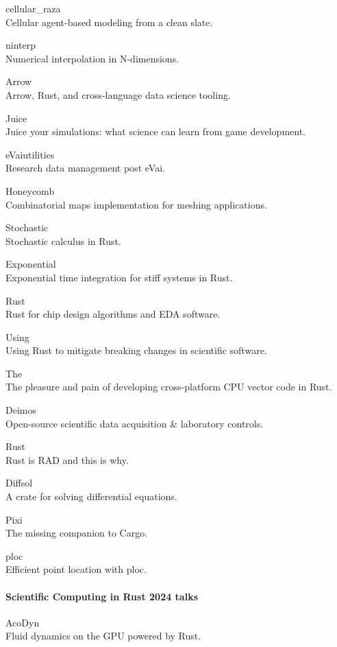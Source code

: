 \documentclass{article}
\begin{document}
cellular\_raza\\
Cellular agent-based modeling from a clean slate.

ninterp\\
Numerical interpolation in N-dimensions.

Arrow\\
Arrow, Rust, and cross-language data science tooling.

Juice\\
Juice your simulations: what science can learn from game development.

eVaiutilities\\
Research data management post eVai.

Honeycomb\\
Combinatorial maps implementation for meshing applications.

Stochastic\\
Stochastic calculus in Rust.

Exponential\\
Exponential time integration for stiff systems in Rust.

Rust\\
Rust for chip design algorithms and EDA software.

Using\\
Using Rust to mitigate breaking changes in scientific software.

The\\
The pleasure and pain of developing cross-platform CPU vector code in Rust.

Deimos\\
Open-source scientific data acquisition \& laboratory controls.

Rust\\
Rust is RAD and this is why.

Diffsol\\
A crate for solving differential equations.

Pixi\\
The missing companion to Cargo.

ploc\\
Efficient point location with ploc.

\paragraph{Scientific Computing in Rust 2024 talks}

AcoDyn\\
Fluid dynamics on the GPU powered by Rust.
\end{document}
